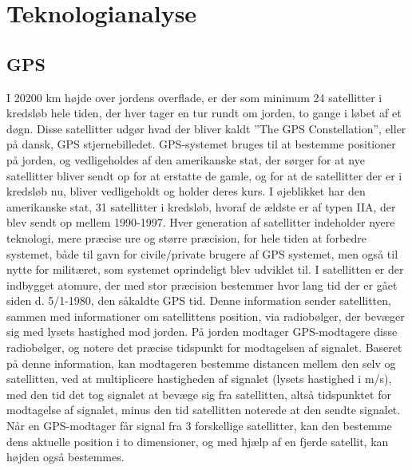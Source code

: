 \section{Teknologianalyse} \label{sec:teknologianalyse}


\subsection{GPS}

I 20200 km højde over jordens overflade, er der som minimum 24 satellitter i kredsløb hele tiden, der hver tager en tur rundt om jorden, to gange i løbet af et døgn. Disse satellitter udgør hvad der bliver kaldt ”The GPS Constellation”, eller på dansk, GPS stjernebilledet.  GPS-systemet bruges til at bestemme positioner på jorden, og vedligeholdes af den amerikanske stat, der sørger for at nye satellitter bliver sendt op for at erstatte de gamle, og for at de satellitter der er i kredsløb nu, bliver vedligeholdt og holder deres kurs. I øjeblikket har den amerikanske stat, 31 satellitter i kredsløb, hvoraf de ældste er af typen IIA, der blev sendt op mellem 1990-1997. Hver generation af satellitter indeholder nyere teknologi, mere præcise ure og større præcision, for hele tiden at forbedre systemet, både til gavn for civile/private brugere af GPS systemet, men også til nytte for militæret, som systemet oprindeligt blev udviklet til. 
I satellitten er der indbygget atomure, der med stor præcision bestemmer hvor lang tid der er gået siden d. 5/1-1980, den såkaldte GPS tid. Denne information sender satellitten, sammen med informationer om satellittens position, via radiobølger, der bevæger sig med lysets hastighed mod jorden. På jorden modtager GPS-modtagere disse radiobølger, og notere det præcise tidspunkt for modtagelsen af signalet. Baseret på denne information, kan modtageren bestemme distancen mellem den selv og satellitten, ved at multiplicere hastigheden af signalet (lysets hastighed i m/s), med den tid det tog signalet at bevæge sig fra satellitten, altså tidspunktet for modtagelse af signalet, minus den tid satellitten noterede at den sendte signalet. Når en GPS-modtager får signal fra 3 forskellige satellitter, kan den bestemme dens aktuelle position i to dimensioner, og med hjælp af en fjerde satellit, kan højden også bestemmes.
